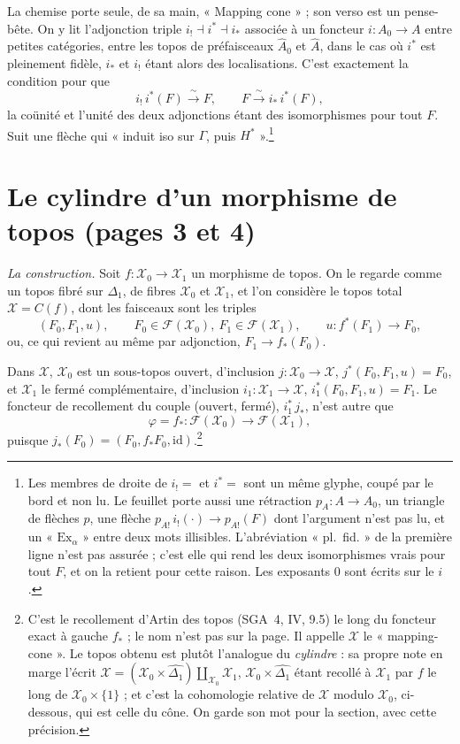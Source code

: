 \documentclass[11pt,a4paper]{article}
\begin{document}
La chemise porte seule, de sa main, « Mapping cone » ; son verso est un
pense-bête. On y lit l'adjonction triple $i_{!} \dashv i^{*} \dashv i_{*}$
associée à un foncteur $i : A_{0} \to A$ entre petites catégories, entre les
topos de préfaisceaux $\widehat{A}_{0}$ et $\widehat{A}$, dans le cas où $i^{*}$
est pleinement fidèle, $i_{*}$ et $i_{!}$ étant alors des localisations. C'est
exactement la condition pour que
\[
i_{!}\, i^{*}(F) \xrightarrow{\;\sim\;} F,
\qquad
F \xrightarrow{\;\sim\;} i_{*}\, i^{*}(F),
\]
la coünité et l'unité des deux adjonctions étant des isomorphismes pour tout
$F$. Suit une flèche qui « induit iso sur $\Gamma$, puis $H^{*}$ ».\footnote{Les
membres de droite de $i_{!} =$ et $i^{*} =$ sont un même glyphe, coupé par le
bord et non lu. Le feuillet porte aussi une rétraction $p_{A} : A \to A_{0}$,
un triangle de flèches $p$, une flèche $p_{A!}\, i_{!}(\cdot) \to p_{A!}(F)$
dont l'argument n'est pas lu, et un « $\mathrm{Ex}_{\alpha}$ » entre deux mots
illisibles. L'abréviation « pl.\ fid. » de la première ligne n'est pas
assurée ; c'est elle qui rend les deux isomorphismes vrais pour tout $F$, et on
la retient pour cette raison. Les exposants $0$ sont écrits sur le $i$.}

\section*{Le cylindre d'un morphisme de topos (pages 3 et 4)}

\emph{La construction.} Soit $f : \mathcal{X}_{0} \to \mathcal{X}_{1}$ un
morphisme de topos. On le regarde comme un topos fibré sur $\Delta_{1}$, de
fibres $\mathcal{X}_{0}$ et $\mathcal{X}_{1}$, et l'on considère le topos total
$\mathcal{X} = C(f)$, dont les faisceaux sont les triples
\[
(F_{0}, F_{1}, u), \qquad F_{0} \in \mathcal{F}(\mathcal{X}_{0}),\
F_{1} \in \mathcal{F}(\mathcal{X}_{1}), \qquad
u : f^{*}(F_{1}) \to F_{0},
\]
ou, ce qui revient au même par adjonction, $F_{1} \to f_{*}(F_{0})$.

Dans $\mathcal{X}$, $\mathcal{X}_{0}$ est un sous-topos ouvert, d'inclusion
$j : \mathcal{X}_{0} \to \mathcal{X}$, $j^{*}(F_{0}, F_{1}, u) = F_{0}$, et
$\mathcal{X}_{1}$ le fermé complémentaire, d'inclusion
$i_{1} : \mathcal{X}_{1} \to \mathcal{X}$, $i_{1}^{*}(F_{0}, F_{1}, u) = F_{1}$.
Le foncteur de recollement du couple (ouvert, fermé), $i_{1}^{*}\, j_{*}$, n'est
autre que
\[
\varphi = f_{*} : \mathcal{F}(\mathcal{X}_{0}) \to \mathcal{F}(\mathcal{X}_{1}),
\]
puisque $j_{*}(F_{0}) = (F_{0}, f_{*}F_{0}, \mathrm{id})$.\footnote{C'est le
recollement d'Artin des topos (SGA~4, IV, 9.5) le long du foncteur exact à
gauche $f_{*}$ ; le nom n'est pas sur la page. Il appelle $\mathcal{X}$ le
« mapping-cone ». Le topos obtenu est plutôt l'analogue du \emph{cylindre} : sa
propre note en marge l'écrit
$\mathcal{X} = (\mathcal{X}_{0} \times \widehat{\Delta_{1}})
\amalg_{\mathcal{X}_{0}} \mathcal{X}_{1}$, $\mathcal{X}_{0} \times
\widehat{\Delta_{1}}$ étant recollé à $\mathcal{X}_{1}$ par $f$ le long de
$\mathcal{X}_{0} \times \{1\}$ ; et c'est la cohomologie relative de
$\mathcal{X}$ modulo $\mathcal{X}_{0}$, ci-dessous, qui est celle du cône. On
garde son mot pour la section, avec cette précision.}
\end{document}
